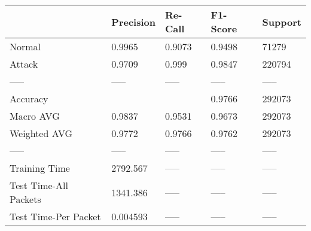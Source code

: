 \begin{tabular}{lllll}
\toprule
{} & Precision & Re-Call & F1-Score & Support \\
\midrule
Normal                &    0.9965 &  0.9073 &   0.9498 &   71279 \\
Attack                &    0.9709 &   0.999 &   0.9847 &  220794 \\
-----                 &     ----- &   ----- &    ----- &   ----- \\
Accuracy              &           &         &   0.9766 &  292073 \\
Macro AVG             &    0.9837 &  0.9531 &   0.9673 &  292073 \\
Weighted AVG          &    0.9772 &  0.9766 &   0.9762 &  292073 \\
-----                 &     ----- &   ----- &    ----- &   ----- \\
Training Time         &  2792.567 &   ----- &    ----- &   ----- \\
Test Time-All Packets &  1341.386 &   ----- &    ----- &   ----- \\
Test Time-Per Packet  &  0.004593 &   ----- &    ----- &   ----- \\
\bottomrule
\end{tabular}
